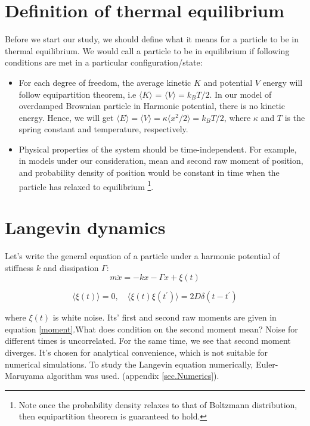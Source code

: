 \documentclass[11pt,a4paper]{article}
\begin{document}
\section{Definition of thermal equilibrium}
Before we start our study, we should define what it means for a particle to be in  thermal equilibrium. We would call a particle to be in equilibrium if following conditions are met  in a particular configuration/state:
\begin{itemize}
\item For each degree of freedom, the average kinetic $K$ and potential $V$  energy will follow equipartition theorem, i.e  $\langle K \rangle$ = $\langle V \rangle = k_B T/2$. In our model of  overdamped Brownian particle in Harmonic potential, there is no kinetic energy. Hence, we will get   $  \langle E \rangle= \langle V \rangle = \kappa \langle x^2 /2\rangle = k_B T/2$, where $\kappa$ and $T$ is the spring constant and temperature, respectively.
\item Physical properties of the system should be time-independent. For example, in models under our consideration, mean and second raw moment of position, and probability density of position would be constant in time when the particle has relaxed to equilibrium \footnote{Note once the probability density relaxes to that of Boltzmann distribution, then equipartition theorem is guaranteed to hold.}.
\end{itemize}


\section{Langevin dynamics}

Let's write the general equation of a particle under a harmonic potential of stiffness $k$ and dissipation $\Gamma$:
\begin{equation}
m \ddot{x}= -k x -\Gamma \dot{x} + \xi(t)
\end{equation}

\begin{equation}
\langle \xi(t)\rangle=0, \quad \langle \xi(t) \xi(t^{\prime}) \rangle= 2 D \delta(t- t^{\prime})
\label{moment}
\end{equation}

where $\xi(t)$ is white noise. Its' first and second raw moments are given in equation \ref{moment}.What does condition on the second moment mean? Noise for different times is uncorrelated. For the same time, we see that second moment diverges. It's chosen for analytical convenience, which is not suitable for numerical simulations. To study the Langevin equation numerically, Euler-Maruyama algorithm was used. (appendix \ref{sec.Numerics}).
\end{document}
